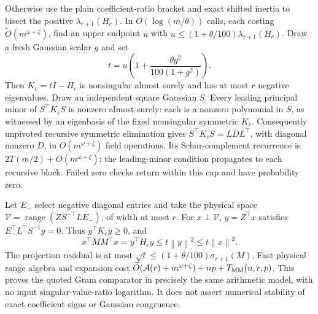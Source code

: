\documentclass[11pt]{article}
\newcommand{\norm}[1]{\left\lVert#1\right\rVert}
\newcommand{\range}{\operatorname{range}}
\newcommand{\MM}{T_{\rm MM}}
\newcommand{\Ac}{\mathcal A}
\begin{document}
Otherwise use the plain coefficient-ratio bracket and exact shifted
inertia to bisect the positive \(\lambda_{r+1}(H_c)\). In
\(O(\log(m/\theta))\) calls, each costing
\(\widetilde O(m^{\omega+\zeta})\), find an upper endpoint \(u\)
with \(u\leq(1+\theta/100)\lambda_{r+1}(H_c)\).
Draw a fresh Gaussian scalar \(g\) and set
\[
 t=u\left(1+\frac{\theta g^2}{100(1+g^2)}\right).
\]
Then \(K_c=tI-H_c\) is nonsingular almost surely and has at most
\(r\) negative eigenvalues. Draw an independent square Gaussian
\(S\). Every leading principal minor of \(S^\top K_cS\) is nonzero
almost surely: each is a nonzero polynomial in \(S\), as witnessed
by an eigenbasis of the fixed nonsingular symmetric \(K_c\).
Consequently unpivoted recursive symmetric elimination gives
\(S^\top K_cS=LDL^\top\), with diagonal nonzero \(D\), in
\(O(m^{\omega+\zeta})\) field operations. Its Schur-complement
recurrence is \(2T(m/2)+O(m^{\omega+\zeta})\); the leading-minor
condition propagates to each recursive block. Failed zero checks return
within this cap and have probability zero.

Let \(E_-\) select negative diagonal entries and take the physical
space \(\mathcal V=\range(ZS^{-\top}LE_-)\), of width at most \(r\).
For \(x\perp\mathcal V\), \(y=Z^\top x\) satisfies
\(E_-^\top L^\top S^{-1}y=0\). Thus \(y^\top K_cy\geq0\), and
\[
 x^\top MM^\top x=y^\top H_cy\leq t\norm y^2\leq t\norm x^2.
\]
The projection residual is at most
\(\sqrt t\leq(1+\theta/100)\sigma_{r+1}(M)\).
Fast physical range algebra and expansion cost
\(\widetilde O(\Ac(r)+m^{\omega+\zeta})+np+\MM(n,r,p)\).
This proves the quoted Gram comparator in precisely the same arithmetic
model, with no input singular-value-ratio logarithm. It does not assert
numerical stability of exact coefficient signs or Gaussian congruence.
\end{document}
